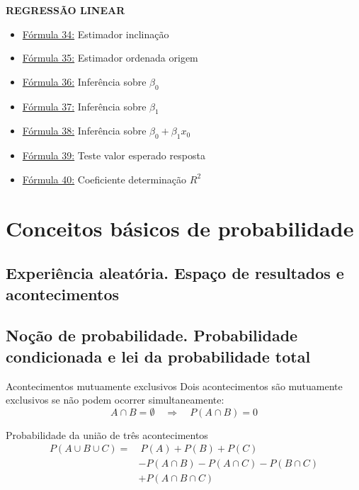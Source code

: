 \documentclass[a4paper,12pt]{article}
\begin{document}
\begin{multicols}{2}
\textbf{\color{sectioncolor}REGRESSÃO LINEAR}
\begin{itemize}[leftmargin=*]
    \item \hyperref[formula34]{\color{formulalink}Fórmula 34:} Estimador inclinação
    \item \hyperref[formula35]{\color{formulalink}Fórmula 35:} Estimador ordenada origem
    \item \hyperref[formula36]{\color{formulalink}Fórmula 36:} Inferência sobre $\beta_0$
    \item \hyperref[formula37]{\color{formulalink}Fórmula 37:} Inferência sobre $\beta_1$
    \item \hyperref[formula38]{\color{formulalink}Fórmula 38:} Inferência sobre $\beta_0 + \beta_1 x_0$
    \item \hyperref[formula39]{\color{formulalink}Fórmula 39:} Teste valor esperado resposta
    \item \hyperref[formula40]{\color{formulalink}Fórmula 40:} Coeficiente determinação $R^2$
\end{itemize}
\end{multicols}

\newpage

\section{\color{sectioncolor}Conceitos básicos de probabilidade}
\subsection{Experiência aleatória. Espaço de resultados e acontecimentos}

\subsection{Noção de probabilidade. Probabilidade condicionada e lei da probabilidade total}

\begin{formulabox}{Acontecimentos mutuamente exclusivos}
Dois acontecimentos são mutuamente exclusivos se não podem ocorrer simultaneamente:
\begin{equation}\label{formula1}\tag{Fórmula 1}
A \cap B = \emptyset \quad \Rightarrow \quad P(A \cap B) = 0
\end{equation}
\end{formulabox}

\begin{formulabox}{Probabilidade da união de três acontecimentos}
\begin{equation}\label{formula2}\tag{Fórmula 2}
\begin{aligned}
    P(A \cup B \cup C) = &\ P(A) + P(B) + P(C) \\
    &- P(A \cap B) - P(A \cap C) - P(B \cap C) \\
    &+ P(A \cap B \cap C)
\end{aligned}
\end{equation}
\end{formulabox}
\end{document}
